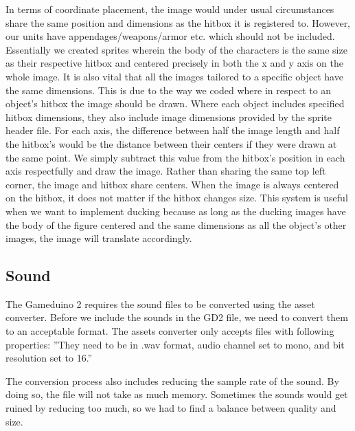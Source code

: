 In terms of coordinate placement, the image would under usual circumstances share the same position and dimensions as the hitbox it is registered to. However, our units have appendages/weapons/armor etc. which should not be included. Essentially we created sprites wherein the body of the characters is the same size as their respective hitbox and centered precisely in both the x and y axis on the whole image. It is also vital that all the images tailored to a specific object have the same dimensions. This is due to the way we coded where in respect to an object's hitbox the image should be drawn. Where each object includes specified hitbox dimensions, they also include image dimensions provided by the sprite header file. For each axis, the difference between half the image length and half the hitbox’s would be the distance between their centers if they were drawn at the same point. We simply subtract this value from the hitbox’s position in each axis respectfully and draw the image. Rather than sharing the same top left corner, the image and hitbox share centers.  When the image is always centered on the hitbox, it does not matter if the hitbox changes size. This system is useful when we want to implement ducking because as long as the ducking images have the body of the figure centered and the same dimensions as all the object’s other images, the image will translate accordingly.


\subsection*{Sound}
The Gameduino 2 requires the sound files to be converted using the asset converter. Before we include the sounds in the GD2 file, we need to convert them to an acceptable format. The assets converter only accepts files with following properties: 
''They need to be in .wav format, audio channel set to mono, and bit resolution set to 16.''

The conversion process also includes reducing the sample rate of the sound. By doing so,
the file will not take as much memory. Sometimes the sounds would get ruined by reducing too much,
so we had to find a balance between quality and size.


